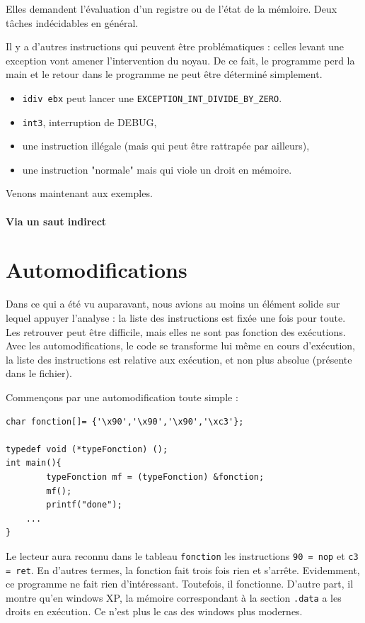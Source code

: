 \documentclass{book}
\newcommand{\code}[1]{\texttt{#1}}
\begin{document}
Elles demandent l'évaluation d'un registre ou de l'état de la mémloire. Deux tâches indécidables en général. 

Il y a d'autres instructions qui peuvent être problématiques : celles levant une exception vont amener l'intervention du noyau. De ce fait, le programme perd la main et le retour dans le programme ne peut être déterminé simplement. 
\begin{itemize}
	\item \code{idiv ebx} peut lancer une \code{EXCEPTION\_INT\_DIVIDE\_BY\_ZERO}.
	\item \code{int3}, interruption de DEBUG,
	\item une instruction illégale (mais qui peut être rattrapée par ailleurs), 
	\item une instruction "normale" mais qui viole un droit en mémoire.	
\end{itemize}

Venons maintenant aux exemples. 

\paragraph{Via un saut indirect}



\section{Automodifications}

Dans ce qui a été vu auparavant, nous avions au moins un élément solide sur lequel appuyer l'analyse : la liste des instructions est fixée une fois pour toute. Les retrouver peut être difficile, mais elles ne sont pas fonction des exécutions. Avec les automodifications, le code se transforme lui même en cours d'exécution, la liste des instructions est relative aux exécution, et non plus absolue (présente dans le fichier). 

Commençons par une automodification toute simple : 

\begin{verbatim}
char fonction[]= {'\x90','\x90','\x90','\xc3'};

typedef void (*typeFonction) (); 
int main(){
        typeFonction mf = (typeFonction) &fonction;
        mf();
        printf("done");
	...
}
\end{verbatim}

Le lecteur aura reconnu dans le tableau {\tt fonction} les instructions {\tt 90 = nop} et {\tt c3 = ret}. En d'autres termes, la fonction  fait trois fois rien et s'arrête. Evidemment, ce programme ne fait rien d'intéressant. Toutefois, il fonctionne. D'autre part, il montre qu'en {\sc windows XP}, la mémoire correspondant à la section {\tt .data} a les droits en exécution. Ce n'est plus le cas des {\sc windows} plus modernes.  
\end{document}
